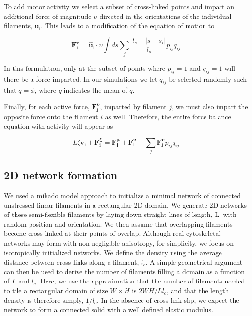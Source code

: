 \documentclass[10pt,letterpaper]{article}
\begin{document}
To add motor activity we select a subset of cross-linked points and impart an additional force of magnitude $\upsilon$ directed in the orientations of the individual filaments, $\mathbf{u_i}$.  This leads to a modification of the equation of motion to

\begin{equation}
\label{eqn:moto}
\mathbf{F^{\upsilon}_i}= \mathbf{\hat{u}_i}\cdot\upsilon\int ds \sum _j \:  \frac{l_s-|s-s_i|}{l_s} p_{ij}q_{ij}
\end{equation}

In this formulation, only at the subset of points where  $p_{ij}=1$ and $q_{ij}=1$ will there be a force imparted.  In our simulations we let $q_{ij}$ be selected randomly such that $\bar{q}=\phi$, where $\bar{q}$ indicates the mean of $q$.

Finally, for each active force, $\mathbf{F^{\upsilon}_j}$, imparted by filament $j$, we must also impart the opposite force onto the filament $i$ as well.  Therefore, the entire force balance equation with activity will appear as

\begin{equation}
\label{eqn:syst3}
L\zeta\mathbf{ v_i} +\mathbf{F^{\xi}_i}= \mathbf{F^{\mu}_i}+\mathbf{F^{\upsilon}_i} - \sum_{j}\mathbf{F^{\upsilon}_j}p_{ij}q_{ij}
\end{equation}

\subsection*{2D network formation}

We used a mikado model approach \cite{Unterberger2014} to initialize a minimal network of connected unstressed linear filaments in a rectangular 2D domain. We generate 2D networks of these semi-flexible filaments by laying down straight lines of length, L, with random position and orientation. We then assume that overlapping filaments become cross-linked at their points of overlap. Although real cytoskeletal networks may form with non-negligible anisotropy, for simplicity, we focus on isotropically initialized networks. We define the density using the average distance between cross-links along a filament, $l_c$. A simple geometrical argument can then be used to derive the number of filaments filling a domain as a function of $L$ and $l_c$\cite{theo_hlm}.  Here, we use the approximation that the number of filaments needed to tile a rectangular domain of size $W \times H$  is $2WH/Ll_c$, and that the length density is therefore simply, $1/l_c$. In the absence of cross-link slip, we expect the network to form a connected solid with a well defined elastic modulus\cite{theo_hlm,theo_hlm2}.
\end{document}
